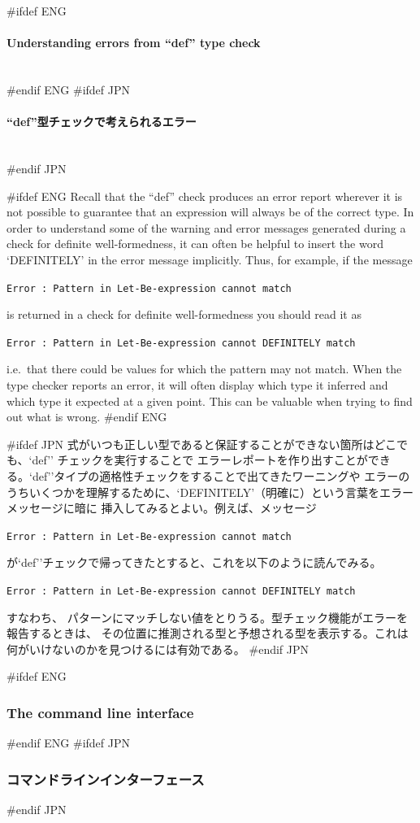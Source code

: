 \documentclass[\pformat,12pt]{article}
\newcommand{\subsubsubsection}[1]{\paragraph{#1}\mbox{}\\}
\begin{document}
#ifdef ENG
\subsubsubsection{Understanding errors from ``def'' type check} 
#endif ENG
#ifdef JPN
\subsubsubsection{``def''型チェックで考えられるエラー} 
#endif JPN

#ifdef ENG
Recall that the ``def'' check produces an error report wherever it is not
possible to guarantee that an expression will always be of the correct type. 
In order to understand some of the warning and error messages
generated during a check for definite well-formedness, it can often be
helpful to  insert the word `DEFINITELY' in the error message
implicitly. Thus, for example, if the message

{\tt Error : Pattern in Let-Be-expression cannot match}

is returned in a check for definite well-formedness you should read it as

{\tt Error : Pattern in Let-Be-expression cannot DEFINITELY match}

i.e.\ that there could be values for which the pattern may not match.
When the type checker reports an error, it will often display which
type it inferred and which type it expected at a given point. This can
be valuable when trying to find out what is wrong.
#endif ENG

#ifdef JPN
式がいつも正しい型であると保証することができない箇所はどこでも、`def'' チェックを実行することで
エラーレポートを作り出すことができる。`def''タイプの適格性チェックをすることで出てきたワーニングや
エラーのうちいくつかを理解するために、`DEFINITELY'（明確に）という言葉をエラーメッセージに暗に
挿入してみるとよい。例えば、メッセージ

{\tt Error : Pattern in Let-Be-expression cannot match}

が`def''チェックで帰ってきたとすると、これを以下のように読んでみる。

{\tt Error : Pattern in Let-Be-expression cannot DEFINITELY match}

すなわち、 パターンにマッチしない値をとりうる。型チェック機能がエラーを報告するときは、
その位置に推測される型と予想される型を表示する。これは何がいけないのかを見つけるには有効である。
#endif JPN

#ifdef ENG
\subsubsection{The command line interface}
#endif ENG
#ifdef JPN
\subsubsection{コマンドラインインターフェース} 
#endif JPN
\end{document}
